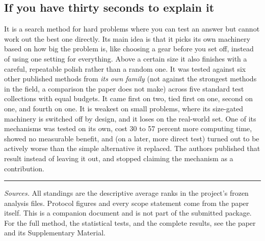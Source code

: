 \documentclass[11pt,a4paper]{article}
\begin{document}
\subsection{If you have thirty seconds to explain it}

\begin{tcolorbox}[colback=boxblue, colframe=boxedge, boxrule=0.5pt, arc=2pt,
  left=3mm, right=3mm, top=2.5mm, bottom=2.5mm]
It is a search method for hard problems where you can test an answer but cannot
work out the best one directly. Its main idea is that it picks its own machinery
based on how big the problem is, like choosing a gear before you set off, instead
of using one setting for everything. Above a certain size it also finishes with a
careful, repeatable polish rather than a random one. It was tested against six
other published methods from \emph{its own family} (not against the strongest
methods in the field, a comparison the paper does not make) across five
standard test collections with equal budgets. It came first on two, tied first on
one, second on one, and fourth on one. It is weakest on small problems, where its
size-gated machinery is switched off by design, and it loses on the real-world
set. One of its mechanisms was tested on its own, cost 30 to 57 percent more
computing time, showed no measurable benefit, and (on a later, more direct
test) turned out to be actively worse than the simple alternative it replaced.
The authors published that result instead of leaving it out, and stopped
claiming the mechanism as a contribution.
\end{tcolorbox}

\vspace{3pt}\hrule\vspace{3pt}
{\footnotesize
\emph{Sources.} All standings are the descriptive average ranks in the project's
frozen analysis files. Protocol figures and every scope statement come from the
paper itself. This is a companion document and is not part of the submitted
package. For the full method, the statistical tests, and the complete results,
see the paper and its Supplementary Material.}
\end{document}

